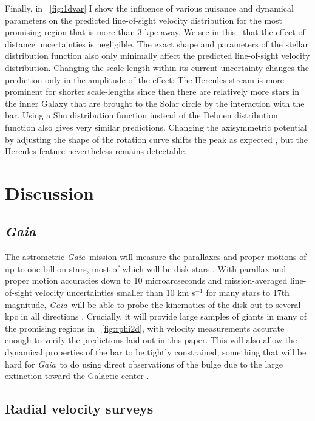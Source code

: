 \documentclass[12pt,preprint]{aastex}
\newcommand{\Gaia}{\emph{Gaia}}
\begin{document}
Finally, in \figurename~\ref{fig:1dvar} I show the influence of
various nuisance and dynamical parameters on the predicted
line-of-sight velocity distribution for the most promising region that
is more than 3 kpc away. We see in this \figurename\ that the effect
of distance uncertainties is negligible. The exact shape and
parameters of the stellar distribution function also only minimally
affect the predicted line-of-sight velocity distribution. Changing the
scale-length within its current uncertainty changes the prediction
only in the amplitude of the effect: The Hercules stream is more
prominent for shorter scale-lengths since then there are relatively
more stars in the inner Galaxy that are brought to the Solar circle by
the interaction with the bar. Using a Shu distribution function
\citep{shu69a} instead of the Dehnen distribution function also gives
very similar predictions. Changing the axisymmetric potential by
adjusting the shape of the rotation curve shifts the peak as expected
\citep[see][]{dehnen00a}, but the Hercules feature nevertheless
remains detectable.



\section{Discussion}

\subsection{\Gaia}

The astrometric \Gaia\ mission will measure the parallaxes and proper
motions of up to one billion stars, most of which will be disk stars
\citep{Perryman01a}. With parallax and proper motion accuracies down
to 10 microarcseconds and mission-averaged line-of-sight velocity
uncertainties smaller than 10 km s$^{-1}$ for many stars to 17th
magnitude, \Gaia\ will be able to probe the kinematics of the disk out
to several kpc in all directions
\citep{Katz04a,bailerjones08a}. Crucially, it will provide large
samples of giants in many of the promising regions in
\figurename~\ref{fig:rphi2d}, with velocity measurements accurate
enough to verify the predictions laid out in this paper. This will
also allow the dynamical properties of the bar to be tightly
constrained, something that will be hard for \Gaia\ to do using direct
observations of the bulge due to the large extinction toward the
Galactic center \citep{robin05a}.


\subsection{Radial velocity surveys}
\end{document}
